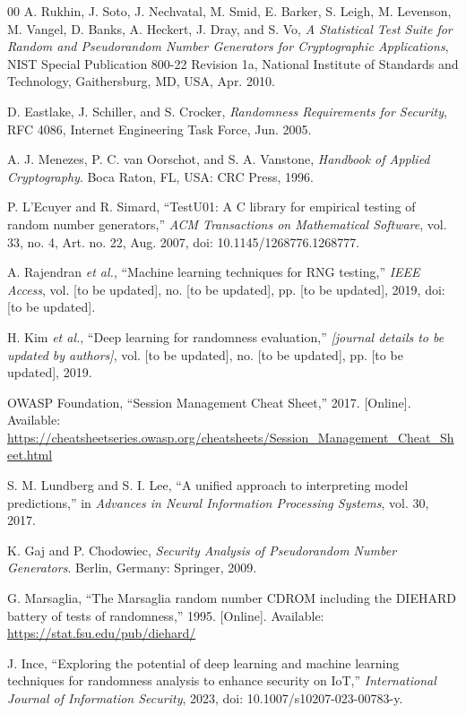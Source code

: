\documentclass[conference]{IEEEtran}
\begin{document}
\begin{thebibliography}{00}
 A. Rukhin, J. Soto, J. Nechvatal, M. Smid, E. Barker, S. Leigh, M. Levenson, M. Vangel, D. Banks, A. Heckert, J. Dray, and S. Vo, \textit{A Statistical Test Suite for Random and Pseudorandom Number Generators for Cryptographic Applications}, NIST Special Publication 800-22 Revision 1a, National Institute of Standards and Technology, Gaithersburg, MD, USA, Apr. 2010.

 D. Eastlake, J. Schiller, and S. Crocker, \textit{Randomness Requirements for Security}, RFC 4086, Internet Engineering Task Force, Jun. 2005.

 A. J. Menezes, P. C. van Oorschot, and S. A. Vanstone, \textit{Handbook of Applied Cryptography}. Boca Raton, FL, USA: CRC Press, 1996.

 P. L'Ecuyer and R. Simard, ``TestU01: A C library for empirical testing of random number generators,'' \textit{ACM Transactions on Mathematical Software}, vol. 33, no. 4, Art. no. 22, Aug. 2007, doi: 10.1145/1268776.1268777.

 A. Rajendran \textit{et al.}, ``Machine learning techniques for RNG testing,'' \textit{IEEE Access}, vol. [to be updated], no. [to be updated], pp. [to be updated], 2019, doi: [to be updated].

 H. Kim \textit{et al.}, ``Deep learning for randomness evaluation,'' \textit{[journal details to be updated by authors]}, vol. [to be updated], no. [to be updated], pp. [to be updated], 2019.

 OWASP Foundation, ``Session Management Cheat Sheet,'' 2017. [Online]. Available: \url{https://cheatsheetseries.owasp.org/cheatsheets/Session_Management_Cheat_Sheet.html}

 S. M. Lundberg and S. I. Lee, ``A unified approach to interpreting model predictions,'' in \textit{Advances in Neural Information Processing Systems}, vol. 30, 2017.

 K. Gaj and P. Chodowiec, \textit{Security Analysis of Pseudorandom Number Generators}. Berlin, Germany: Springer, 2009.

 G. Marsaglia, ``The Marsaglia random number CDROM including the DIEHARD battery of tests of randomness,'' 1995. [Online]. Available: \url{https://stat.fsu.edu/pub/diehard/}

 J. Ince, ``Exploring the potential of deep learning and machine learning techniques for randomness analysis to enhance security on IoT,'' \textit{International Journal of Information Security}, 2023, doi: 10.1007/s10207-023-00783-y.


\end{thebibliography}
\end{document}
